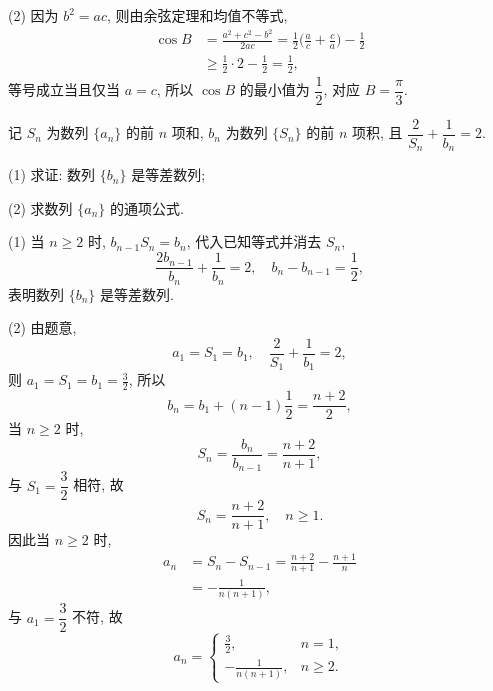     (2) 因为 $b^2=ac$, 则由余弦定理和均值不等式,
    \[\begin{aligned}
        \cos B
        &= \frac{a^2+c^2- b^2}{2ac}
         = \frac12\biggl(\frac{a}c+ \frac{c}a\biggr)- \frac12\\
        &\geqslant \frac12\cdot 2- \frac12= \frac12,
    \end{aligned}\]
    等号成立当且仅当 $a=c$, 所以 $\cos B$ 的最小值为 $\dfrac12$, 对应 $B=\dfrac\pi3$.
\endsolution

\begin{exercise}
    记 $S_n$ 为数列 $\{a_n\}$ 的前 $n$ 项和, $b_n$ 为数列 $\{S_n\}$ 的前 $n$ 项积, 且 $\dfrac2{S_n}+ \dfrac1{b_n}=2$.

    (1) 求证: 数列 $\{b_n\}$ 是等差数列;

    (2) 求数列 $\{a_n\}$ 的通项公式.
\end{exercise}
\beginsolution
    (1) 当 $n\geqslant 2$ 时, $b_{n-1}S_n= b_n$, 代入已知等式并消去 $S_n$,
    \[\dfrac{2b_{n-1}}{b_n}+ \dfrac1{b_n}=2,\quad
    b_n- b_{n-1}= \frac12,\]
    表明数列 $\{b_n\}$ 是等差数列.

    (2) 由题意,
    \[a_1= S_1= b_1,\quad \dfrac2{S_1}+ \dfrac1{b_1}=2,\]
    则 $a_1= S_1= b_1= \frac32$, 所以
    \[b_n= b_1+(n-1)\frac12= \frac{n+2}2,\]
    当 $n\geqslant 2$ 时,
    \[S_n= \frac{b_n}{b_{n-1}}= \frac{n+2}{n+1},\]
    与 $S_1= \dfrac32$ 相符, 故
    \[S_n= \frac{n+2}{n+1},\quad n\geqslant 1.\]
    因此当 $n\geqslant 2$ 时,
    \[\begin{aligned}
        a_n
        &= S_n-S_{n-1}= \frac{n+2}{n+1}- \frac{n+1}{n}\\
        &= -\frac1{n(n+1)},
    \end{aligned}\]
    与 $a_1= \dfrac32$ 不符, 故
    \[a_n= \begin{cases}
        \frac32, & n=1,\\
        -\frac1{n(n+1)}, & n\geqslant 2.
    \end{cases}\]
\endsolution